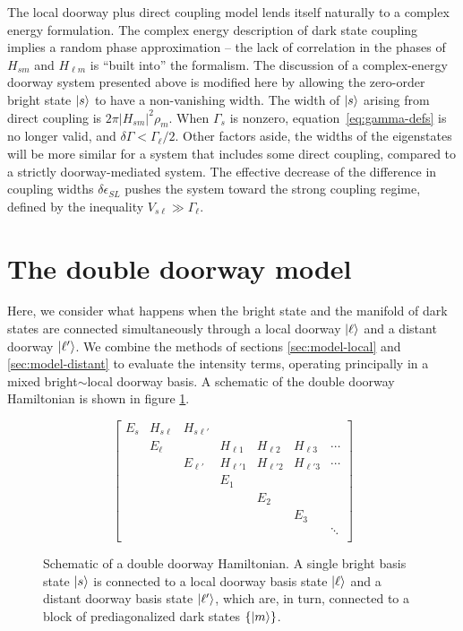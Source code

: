 The local doorway plus direct coupling model lends itself naturally to
a complex energy formulation.  The complex energy description of dark
state coupling implies a random phase approximation -- the lack of
correlation in the phases of $H_{sm}$ and $H_{\ell m}$ is ``built
into'' the formalism.  The discussion of a complex-energy doorway
system presented above is modified here by allowing the zero-order
bright state $\mathinner{|{s}\rangle}$ to have a non-vanishing width.  The width of
$\mathinner{|{s}\rangle}$ arising from direct coupling is $2 \pi \lvert H_{sm}
\rvert^2 \rho_m$.  When $\Gamma_s$ is nonzero,
equation~\ref{eq:gamma-defs} is no longer valid, and $\delta \Gamma <
\Gamma_\ell / 2$.  Other factors aside, the widths of the eigenstates
will be more similar for a system that includes some direct coupling,
compared to a strictly doorway-mediated system.  The effective
decrease of the difference in coupling widths $\delta \epsilon_{SL}$
pushes the system toward the strong coupling regime, defined by the
inequality $V_{s\ell} \gg \Gamma_\ell$.


\section{The double doorway model}
\label{sec:model-double}

Here, we consider what happens when the bright state and the manifold
of dark states are connected simultaneously through a local doorway
$\mathinner{|{\ell}\rangle}$ and a distant doorway $\mathinner{|{\ell'}\rangle}$. We combine the
methods of sections \ref{sec:model-local} and \ref{sec:model-distant}
to evaluate the intensity terms, operating principally in a mixed
bright$\sim$local doorway basis.  A schematic of the double doorway
Hamiltonian is shown in figure \ref{fig:matrix-double}.

\begin{figure}
  \caption{Schematic of a double doorway Hamiltonian. A single bright
    basis state $\mathinner{|{s}\rangle}$ is connected to a local doorway basis state
    $\mathinner{|{\ell}\rangle}$ and a distant doorway basis state $\mathinner{|{\ell'}\rangle}$, which
    are, in turn, connected to a block of prediagonalized dark states
    $\lbrace \mathinner{|{m}\rangle} \rbrace$.}
  \label{fig:matrix-double}
  \begin{equation*}
    \begin{bmatrix}
    E_s & H_{s \ell} & H_{s\ell'} \\
    & E_\ell & & H_{\ell 1} & H_{\ell 2} & H_{\ell 3} & \dotsm \\
    & & E_{\ell'} & H_{\ell' 1} & H_{\ell' 2} & H_{\ell' 3} & \dotsm \\
    & & & E_1 \\
    & & & & E_2 \\
    & & & & & E_3 \\
    & & & & & & \ddots \\
    \end{bmatrix}
  \end{equation*}
\end{figure}


